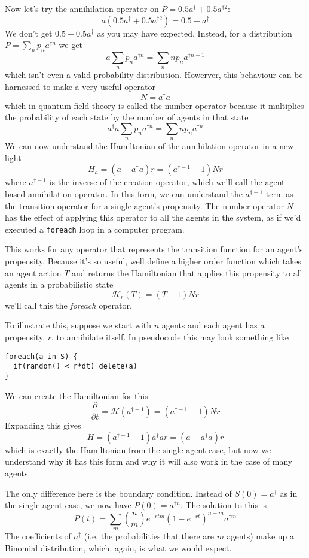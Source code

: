 \documentclass[letterpaper,twocolumn,10pt]{article}
\begin{document}
Now let's try the annihilation operator on $P = 0.5a^\dag + 0.5a^{\dag 2}$:
\[
a (0.5a^\dag + 0.5a^{\dag 2}) = 0.5 + a^\dag
\]
We don't get $0.5 + 0.5a^\dag$ as you may have expected. Instead, for a distribution $P = \sum_n p_na^{\dag n}$ we get
\[
a \sum_n p_na^{\dag n} = \sum_n n p_n a^{\dag n-1}
\]
which isn't even a valid probability distribution. Howerver, this behaviour can be harnessed to make a very useful operator
\[
N = a^\dag a
\]
which in quantum field theory is called the number operator because it multiplies the probability of each state by the number of agents in that state
\[
a^\dag a \sum_n p_na^{\dag n} = \sum_n n p_n a^{\dag n}
\]
We can now understand the Hamiltonian of the annihilation operator in a new light
\[
H_a = (a - a^\dag a)r = (a^{\dag -1} - 1)Nr
\]
where $a^{\dag -1}$ is the inverse of the creation operator, which we'll call the agent-based annihilation operator. In this form, we can understand the $a^{\dag -1}$ term as the transition operator for a single agent's propensity. The number operator $N$ has the effect of applying this operator to all the agents in the system, as if we'd executed a \texttt{foreach} loop in a computer program.

This works for any operator that represents the transition function for an agent's propensity. Because it's so useful, well define a higher order function which takes an agent action $T$ and returns the Hamiltonian that applies this propensity to all agents in a probabilistic state
\[
\mathcal{H}_r(T) = (T - 1)Nr
\]
we'll call this the \textit{foreach} operator.

To illustrate this, suppose we start with $n$ agents and each agent has a propensity, $r$, to annihilate itself. In pseudocode this may look something like
\begin{verbatim}
foreach(a in S) {
  if(random() < r*dt) delete(a)
}
\end{verbatim}

We can create the Hamiltonian for this
\[
\frac{\partial}{\partial t} = \mathcal{H}(a^{\dag -1}) = (a^{\dag-1} - 1)Nr
\]
Expanding this gives
\[
H = (a^{\dag-1} - 1)a^\dag ar = (a - a^\dag a)r
\]
which is exactly the Hamiltonian from the single agent case, but now we understand why it has this form and why it will also work in the case of many agents.

The only difference here is the boundary condition. Instead of $S(0) = a^\dag$ as in the single agent case, we now have $P(0) = a^{\dag n}$. The solution to this is
\[
P(t) = \sum_m{n\choose m}e^{-rtm}(1-e^{-rt})^{n-m}a^{\dag m}
\]
The coefficients of $a^\dag$ (i.e. the probabilities that there are $m$ agents) make up a Binomial distribution, which, again, is what we would expect.
\end{document}
